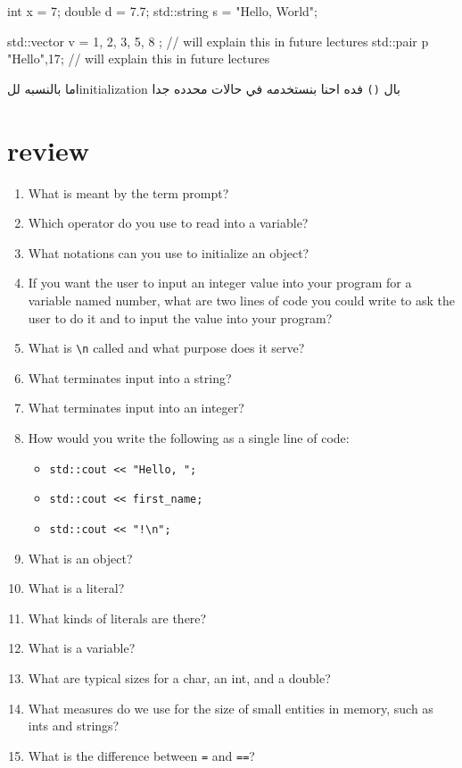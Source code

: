 \documentclass[11pt]{article}
\let\OriginalVerbatim\verbatim
\let\endOriginalVerbatim\endverbatim
\renewenvironment{verbatim}{\begin{english}\OriginalVerbatim}{\endOriginalVerbatim\end{english}}
\begin{document}
\begin{verbatim}
int x = 7;
double d = 7.7;
std::string s = "Hello, World\n";

std::vector v = {1, 2, 3, 5, 8 }; // will explain this in future lectures
std::pair p {"Hello",17}; // will explain this in future lectures
\end{verbatim}

اما بالنسبه للinitialization بال \texttt{()} فده احنا بنستخدمه في حالات محدده جدا
\section{review}
\label{sec:orga154eb3}
\begin{enumerate}
\item What is meant by the term prompt?
\item Which operator do you use to read into a variable?
\item What notations can you use to initialize an object?
\item If you want the user to input an integer value into your program for a variable named number,
what are two lines of code you could write to ask the user to do it and to input the value into
your program?
\item What is \texttt{\textbackslash{}n} called and what purpose does it serve?
\item What terminates input into a string?
\item What terminates input into an integer?
\item How would you write the following as a single line of code:
\begin{itemize}
\item \texttt{std::cout <{}<{} "Hello, ";}
\item \texttt{std::cout <{}<{} first\_name;}
\item \texttt{std::cout <{}<{} "!\textbackslash{}n";}
\end{itemize}
\item What is an object?
\item What is a literal?
\item What kinds of literals are there?
\item What is a variable?
\item What are typical sizes for a char, an int, and a double?
\item What measures do we use for the size of small entities in memory, such as ints and strings?
\item What is the difference between \texttt{=} and \texttt{==}?

\end{enumerate}
\end{document}

